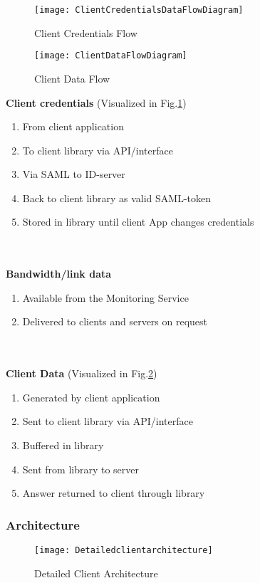     \begin{figure}[h]
        \centering
        \texttt{[image: ClientCredentialsDataFlowDiagram]}
        \caption{Client Credentials Flow}
        \label{fig:ClientCredentialsDataFlowDiagram}
    \end{figure}
    
    \begin{figure}[h]
        \centering
        \texttt{[image: ClientDataFlowDiagram]}
        \caption{Client Data Flow}
        \label{fig:ClientDataFlowDiagram}
    \end{figure}
    
		\textbf{Client credentials} (Visualized in Fig.\ref{fig:ClientCredentialsDataFlowDiagram})
		\begin{enumerate}
			\item From client application
			\item To client library via API/interface
			\item Via SAML to ID-server
			\item Back to client library as valid SAML-token
			\item Stored in library until client App changes credentials
		\end{enumerate}
		\\\\
		\textbf{Bandwidth/link data}
		\begin{enumerate}
			\item Available from the Monitoring Service
			\item Delivered to clients and servers on request
		\end{enumerate}
		\\\\
		\textbf{Client Data} (Visualized in Fig.\ref{fig:ClientDataFlowDiagram})
		
		\begin{enumerate}
			\item Generated by client application
			\item Sent to client library via API/interface
			\item Buffered in library
			\item Sent from library to server
			\item Answer returned to client through library
		\end{enumerate}
		
	\subsubsection{Architecture}\label{client architecture}
		\begin{figure}[h]
			\centering	
			\texttt{[image: Detailedclientarchitecture]}
			\caption{Detailed Client Architecture}
			\label{fig:DetailedClientArchitecture}
		\end{figure}

